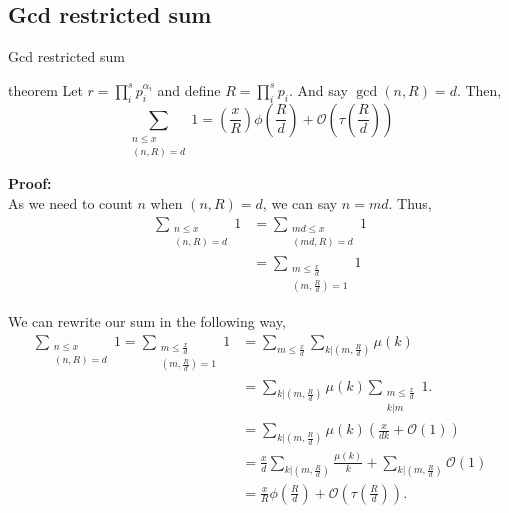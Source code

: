 \documentclass{beamer}
\numberwithin{theorem}{section}
\theoremstyle{definition}
\begin{document}
       \subsection{Gcd restricted sum}
       \begin{frame}[shrink=5]{Gcd restricted sum}
           \begin{block}{theorem}
               Let $r=\prod_{i}^sp_i^{\alpha_i}$ and define $R=\prod_{i}^sp_i$. And say $\gcd(n,R)=d$. Then,
               $$\sum\limits_{\substack{n\le x\\(n,R)=d}}1=\left(\frac{x}{R}\right)\phi\left(\frac{R}{d}\right)+\mathcal{O}\left(\tau\left(\frac{R}{d}\right)\right)$$
           \end{block}
           \textbf{Proof:}\\
               As we need to count $n$ when $(n,R)=d$, we can say $n=md$. Thus,
               \begin{align*}
                   \sum\limits_{\substack{n\le x\\(n,R)=d}}1&=\sum\limits_{\substack{md\le x\\ (md,R)=d}}1\\
                   &=\sum\limits_{\substack{m\le \frac{x}{d}\\(m,\frac{R}{d})=1}}1
               \end{align*}
       \end{frame}
       \begin{frame}[shrink=5]
       We can rewrite our sum in the following way,
       \begin{align*}
           \sum\limits_{\substack{n\le x\\(n,R)=d}}1=\sum\limits_{\substack{m\le \frac{x}{d}\\(m,\frac{R}{d})=1}}1&=\sum_{m\le \frac{x}{d}}\sum_{k|(m,\frac{R}{d})}\mu(k)\\
           &=\sum_{k|(m,\frac{R}{d})}\mu(k)\sum\limits_{\substack{m\le \frac{x}{d}\\k|m }}1. \\
           &=\sum_{k|(m,\frac{R}{d})}\mu(k)\left(\frac{x}{dk}+\mathcal{O}(1)\right)\\&=\frac{x}{d}\sum_{k|(m,\frac{R}{d})}\frac{\mu(k)}{k}+\sum_{k|(m,\frac{R}{d})}\mathcal{O}(1)\\ &=\frac{x}{R}\phi\left(\frac{R}{d}\right)+\mathcal{O}\left(\tau\left(\frac{R}{d}\right)\right).
       \end{align*}
           
       \end{frame}
       
\end{document}
